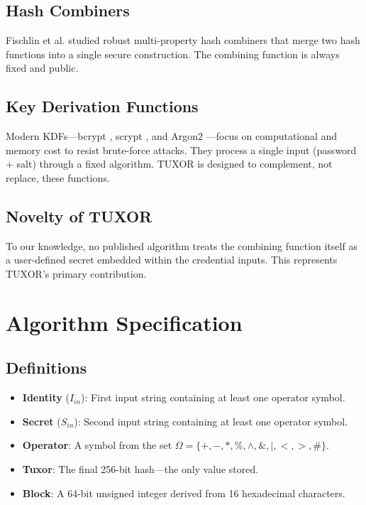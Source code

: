 \documentclass[11pt,a4paper]{article}
\begin{document}
\subsection{Hash Combiners}
Fischlin et al. \cite{fischlin2013combiners} studied robust multi-property hash combiners that merge two hash functions into a single secure construction. The combining function is always fixed and public.

\subsection{Key Derivation Functions}
Modern KDFs---bcrypt \cite{provos1999bcrypt}, scrypt \cite{percival2009scrypt}, and Argon2 \cite{biryukov2016argon2}---focus on computational and memory cost to resist brute-force attacks. They process a single input (password + salt) through a fixed algorithm. TUXOR is designed to complement, not replace, these functions.

\subsection{Novelty of TUXOR}
To our knowledge, no published algorithm treats the combining function itself as a user-defined secret embedded within the credential inputs. This represents TUXOR's primary contribution.

\section{Algorithm Specification}

\subsection{Definitions}

\begin{itemize}[noitemsep]
  \item \textbf{Identity} ($I_{in}$): First input string containing at least one operator symbol.
  \item \textbf{Secret} ($S_{in}$): Second input string containing at least one operator symbol.
  \item \textbf{Operator}: A symbol from the set $\Omega = \{+, -, *, \%, \wedge, \&, |, <, >, \#\}$.
  \item \textbf{Tuxor}: The final 256-bit hash---the only value stored.
  \item \textbf{Block}: A 64-bit unsigned integer derived from 16 hexadecimal characters.
\end{itemize}
\end{document}
